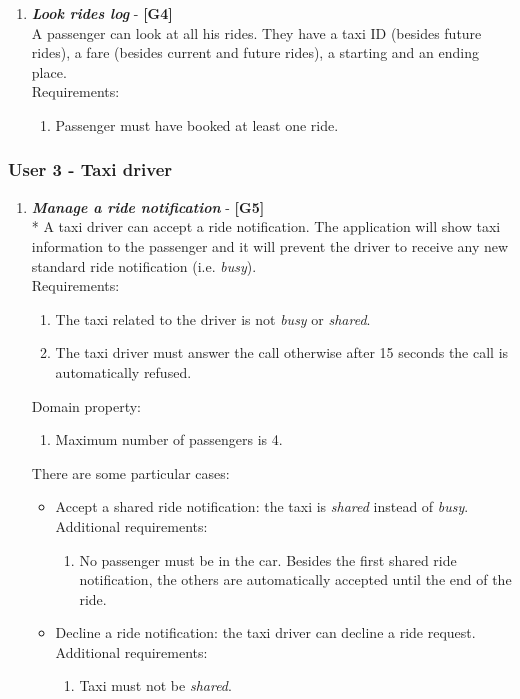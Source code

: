 \documentclass{article}
\begin{document}
\begin{enumerate}
\item \textit{\textbf{Look rides log}} - \textbf{[G4]}\\
A passenger can look at all his rides. They have a taxi ID (besides future rides), a fare (besides current and future rides), a starting and an ending place.\\
Requirements:
\begin{enumerate}
\item Passenger must have booked at least one ride.
\end{enumerate}
\end{enumerate}

\subsubsection{User 3 - Taxi driver}
\begin{enumerate}

\item \textit{\textbf{Manage a ride notification}} - \textbf{[G5]}\\*
A taxi driver can accept a ride notification. The application will show taxi information to the passenger and it will prevent the driver to receive any new standard ride notification  (i.e. \textit{busy}).\\
Requirements:
\begin{enumerate}
\item The taxi related to the driver is not \textit{busy} or \textit{shared}.
\item The taxi driver must answer the call otherwise after 15 seconds the call is automatically refused.
\end{enumerate}
Domain property:
\begin{enumerate}
\item Maximum number of passengers is 4.
\end{enumerate}
There are some particular cases:
\begin{itemize}
\item Accept a shared ride notification: the taxi is \textit{shared} instead of \textit{busy}.\\
Additional requirements:
\begin{enumerate}
\item No passenger must be in the car. Besides the first shared ride notification, the others are automatically accepted until the end of the ride.
\end{enumerate}
\item Decline a ride notification: the taxi driver can decline a ride request.\\
Additional requirements:
\begin{enumerate}
\item Taxi must not be \textit{shared}.
\end{enumerate}
\end{itemize}


\end{enumerate}
\end{document}
